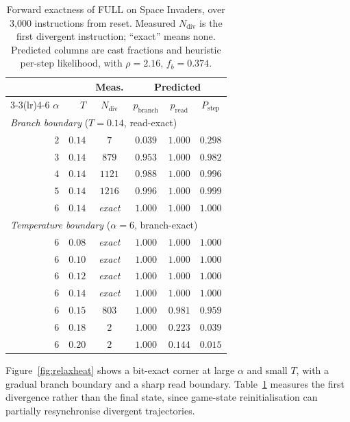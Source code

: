 \documentclass[letterpaper]{article} %
\begin{document}
\begin{table}[tb]
\centering
\caption{Forward exactness of FULL on Space Invaders,
over 3,000 instructions from reset. Measured
$N_{\mathrm{div}}$ is the first divergent instruction;
``exact'' means none. Predicted columns are cast
fractions and heuristic per-step likelihood, with
$\rho=2.16$, $f_b=0.374$.}
\label{tab:relax-exact}
\small
\setlength{\tabcolsep}{4pt}
\begin{tabular}{rr c | ccc}
\toprule
\multicolumn{2}{c}{} & Meas. & \multicolumn{3}{c}{Predicted}\\
\cmidrule(lr){3-3}\cmidrule(lr){4-6}
$\alpha$ & $T$ & $N_{\mathrm{div}}$ &
$p_{\mathrm{branch}}$ & $p_{\mathrm{read}}$ &
$P_{\mathrm{step}}$\\
\midrule
\multicolumn{6}{l}{\emph{Branch boundary} ($T=0.14$, read-exact)}\\
$2$ & $0.14$ & $7$     & $0.039$ & $1.000$ & $0.298$\\
$3$ & $0.14$ & $879$   & $0.953$ & $1.000$ & $0.982$\\
$4$ & $0.14$ & $1121$  & $0.988$ & $1.000$ & $0.996$\\
$5$ & $0.14$ & $1216$  & $0.996$ & $1.000$ & $0.999$\\
$6$ & $0.14$ & \emph{exact} & $1.000$ & $1.000$ & $1.000$\\
\midrule
\multicolumn{6}{l}{\emph{Temperature boundary} ($\alpha=6$, branch-exact)}\\
$6$ & $0.08$ & \emph{exact} & $1.000$ & $1.000$ & $1.000$\\
$6$ & $0.10$ & \emph{exact} & $1.000$ & $1.000$ & $1.000$\\
$6$ & $0.12$ & \emph{exact} & $1.000$ & $1.000$ & $1.000$\\
$6$ & $0.14$ & \emph{exact} & $1.000$ & $1.000$ & $1.000$\\
$6$ & $0.15$ & $803$ & $1.000$ & $0.981$ & $0.959$\\
$6$ & $0.18$ & $2$   & $1.000$ & $0.223$ & $0.039$\\
$6$ & $0.20$ & $2$   & $1.000$ & $0.144$ & $0.015$\\
\bottomrule
\end{tabular}
\end{table}

Figure~\ref{fig:relaxheat} shows a bit-exact corner
at large $\alpha$ and small $T$, with a gradual
branch boundary and a sharp read boundary.
Table~\ref{tab:relax-exact} measures the first
divergence rather than the final state, since
game-state reinitialisation can partially
resynchronise divergent trajectories.
\end{document}
